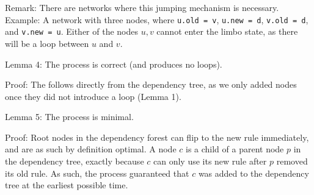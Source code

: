 Remark: There are networks where this jumping mechanism is necessary. Example: A network with three nodes, where \texttt{u.old = v}, \texttt{u.new = d}, \texttt{v.old = d}, and \texttt{v.new = u}. Either of the nodes $u,v$ cannot enter the limbo state, as there will be a loop between $u$ and $v$.

Lemma 4: The process is correct (and produces no loops).

Proof: The follows directly from the dependency tree, as we only added nodes once they did not introduce a loop (Lemma 1).

Lemma 5: The process is minimal.

Proof: Root nodes in the dependency forest can flip to the new rule immediately, and are as such by definition optimal. A node $c$ is a child of a parent node $p$ in the dependency tree, exactly because $c$ can only use its new rule after $p$ removed its old rule. As such, the process guaranteed that $c$ was added to the dependency tree at the earliest possible time.

